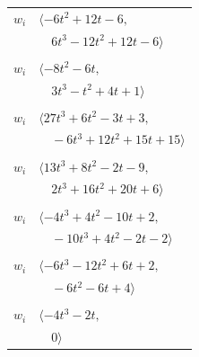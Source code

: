 \documentclass[11pt]{article}
\begin{document}
\begin{longtable}{@{}ll@{}}
$w_i$ & $\langle -6t^{2}+12t-6,$\\
 & $\quad 6t^{3}-12t^{2}+12t-6\rangle$\\
\addlinespace[2pt]
\multicolumn{2}{@{}p{0.97\textwidth}@{}}{$i=13$, $D_i=2$, $\rho_{ij}$: $0{:}2, \allowbreak 1{:}2, \allowbreak 5{:}1, \allowbreak 7{:}1, \allowbreak 8{:}1, \allowbreak 11{:}1, \allowbreak 25{:}2$}\\
$w_i$ & $\langle -8t^{2}-6t,$\\
 & $\quad 3t^{3}-t^{2}+4t+1\rangle$\\
\addlinespace[2pt]
\multicolumn{2}{@{}p{0.97\textwidth}@{}}{$i=14$, $D_i=4$, $\rho_{ij}$: $3{:}1, \allowbreak 5{:}2, \allowbreak 7{:}1, \allowbreak 9{:}2, \allowbreak 21{:}2, \allowbreak 24{:}2, \allowbreak 25{:}2$}\\
$w_i$ & $\langle 27t^{3}+6t^{2}-3t+3,$\\
 & $\quad -6t^{3}+12t^{2}+15t+15\rangle$\\
\addlinespace[2pt]
\multicolumn{2}{@{}p{0.97\textwidth}@{}}{$i=15$, $D_i=2$, $\rho_{ij}$: $9{:}2, \allowbreak 16{:}2, \allowbreak 21{:}1, \allowbreak 22{:}1, \allowbreak 24{:}2, \allowbreak 26{:}2, \allowbreak 27{:}1$}\\
$w_i$ & $\langle 13t^{3}+8t^{2}-2t-9,$\\
 & $\quad 2t^{3}+16t^{2}+20t+6\rangle$\\
\addlinespace[2pt]
\multicolumn{2}{@{}p{0.97\textwidth}@{}}{$i=16$, $D_i=2$, $\rho_{ij}$: $8{:}1, \allowbreak 15{:}1, \allowbreak 19{:}2, \allowbreak 25{:}2, \allowbreak 27{:}2$}\\
$w_i$ & $\langle -4t^{3}+4t^{2}-10t+2,$\\
 & $\quad -10t^{3}+4t^{2}-2t-2\rangle$\\
\addlinespace[2pt]
\multicolumn{2}{@{}p{0.97\textwidth}@{}}{$i=17$, $D_i=4$, $\rho_{ij}$: $1{:}1, \allowbreak 2{:}2, \allowbreak 3{:}2, \allowbreak 6{:}2, \allowbreak 7{:}2, \allowbreak 8{:}1, \allowbreak 11{:}1, \allowbreak 20{:}1, \allowbreak 25{:}1$}\\
$w_i$ & $\langle -6t^{3}-12t^{2}+6t+2,$\\
 & $\quad -6t^{2}-6t+4\rangle$\\
\addlinespace[2pt]
\multicolumn{2}{@{}p{0.97\textwidth}@{}}{$i=18$, $D_i=2$, $\rho_{ij}$: $3{:}1, \allowbreak 8{:}1, \allowbreak 9{:}1, \allowbreak 10{:}2, \allowbreak 12{:}2, \allowbreak 20{:}2, \allowbreak 21{:}1$}\\
$w_i$ & $\langle -4t^{3}-2t,$\\
 & $\quad 0\rangle$\\

\end{longtable}
\end{document}
